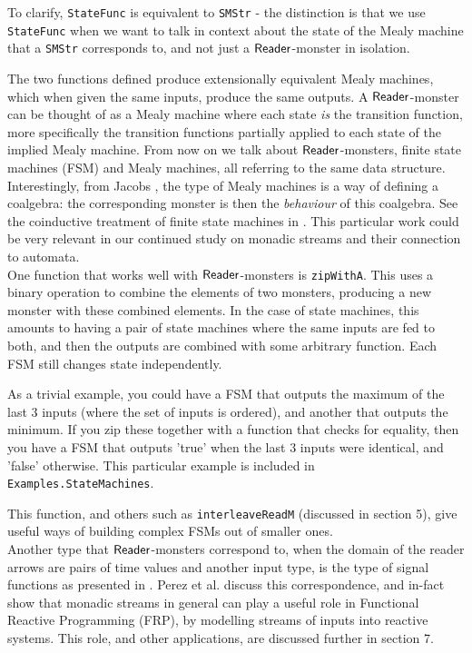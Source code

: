 To clarify, \verb+StateFunc+ is equivalent to \verb+SMStr+ - the distinction is that we use \verb+StateFunc+ when we want to talk in context about the state of the Mealy machine that a \verb+SMStr+ corresponds to, and not just a $\mathsf{Reader}$-monster in isolation.

The two functions defined produce extensionally equivalent Mealy machines, which when given the same inputs, produce the same outputs. A $\mathsf{Reader}$-monster can be thought of as a Mealy machine where each state \emph{is} the transition function, more specifically the transition functions partially applied to each state of the implied Mealy machine. From now on we talk about $\mathsf{Reader}$-monsters, finite state machines (FSM) and Mealy machines, all referring to the same data structure. \\

Interestingly, from Jacobs \cite{jacobs:2016}, the type of Mealy machines is a way of defining a coalgebra: the corresponding monster is then the \emph{behaviour} of this coalgebra. See the coinductive treatment of finite state machines in \cite{jacobs:2016}. This particular work could be very relevant in our continued study on monadic streams and their connection to automata. \\

One function that works well with $\mathsf{Reader}$-monsters is \verb+zipWithA+. This uses a binary operation to combine the elements of two monsters, producing a new monster with these combined elements. In the case of state machines, this amounts to having a pair of state machines where the same inputs are fed to both, and then the outputs are combined with some arbitrary function. Each FSM still changes state independently.

As a trivial example, you could have a FSM that outputs the maximum of the last $3$ inputs (where the set of inputs is ordered), and another that outputs the minimum. If you zip these together with a function that checks for equality, then you have a FSM that outputs 'true' when the last $3$ inputs were identical, and 'false' otherwise. This particular example is included in \verb+Examples.StateMachines+.

This function, and others such as \verb+interleaveReadM+ (discussed in section 5), give useful ways of building complex FSMs out of smaller ones. \\

Another type that $\mathsf{Reader}$-monsters correspond to, when the domain of the reader arrows are pairs of time values and another input type, is the type of signal functions as presented in \cite{frp_refactored}. Perez et al. discuss this correspondence, and in-fact show that monadic streams in general can play a useful role in Functional Reactive Programming (FRP), by modelling streams of inputs into reactive systems. This role, and other applications, are discussed further in section 7.
                             
